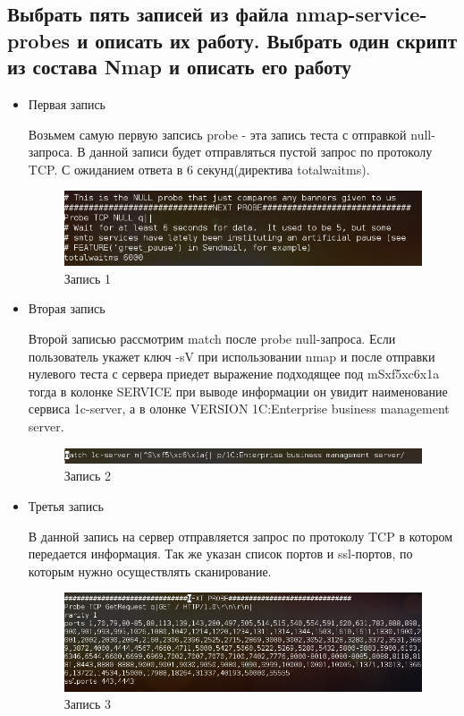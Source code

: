 \documentclass[11pt, a4paper]{article}		%
\begin{document}

\subsection{Выбрать пять записей из файла nmap-service-probes и описать их работу. Выбрать один скрипт из состава Nmap и описать его работу}

\begin{itemize}
\item Первая запись

Возьмем самую первую запсись probe - эта запись теста с отправкой null-запроса. В данной записи будет отправляться пустой запрос по протоколу TCP. С ожиданием ответа в 6 секунд(директива totalwaitms).

\begin{figure}[h!]
\centering
\includegraphics[scale=0.8]{res/probe_1}
\caption{Запись 1}
\end{figure}

\item Вторая запись

Второй записью рассмотрим match после probe null-запроса. Если пользователь укажет ключ -sV при использовании nmap и после отправки нулевого теста с сервера приедет выражение подходящее под mSxf5xc6x1a тогда в колонке SERVICE при выводе информации он увидит наименование сервиса 1c-server, а в олонке VERSION 1C:Enterprise business management server.

\begin{figure}[h!]
\centering
\includegraphics[scale=0.8]{res/probe_2}
\caption{Запись 2}
\end{figure}

\item Третья запись

В данной запись на сервер отправляется запрос по протоколу TCP в котором передается информация. Так же указан список портов и ssl-портов, по которым нужно осуществлять сканирование.

\begin{figure}[h!]
\centering
\includegraphics[scale=0.8]{res/probe_3}
\caption{Запись 3}
\end{figure}


\end{itemize}
\end{document}
